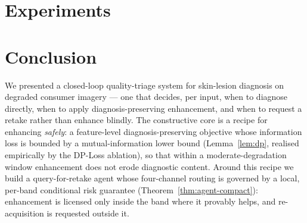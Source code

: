 \documentclass{article}
\begin{document}










\section{Experiments}\label{sec:exp}








\section{Conclusion}\label{sec:conclusion}
We presented a closed-loop quality-triage system for skin-lesion diagnosis on degraded consumer
imagery --- one that decides, per input, when to diagnose directly, when to apply
diagnosis-preserving enhancement, and when to request a retake rather than enhance blindly. The
constructive core is a recipe for enhancing \emph{safely}: a feature-level diagnosis-preserving
objective whose information loss is bounded by a mutual-information lower bound (Lemma~\ref{lem:dp},
realised empirically by the DP-Loss ablation), so that within a moderate-degradation window
enhancement does not erode diagnostic content. Around this recipe we build a query-for-retake
agent whose four-channel routing is governed by a local, per-band conditional risk guarantee
(Theorem~\ref{thm:agent-compact}): enhancement is licensed only inside the band where it provably
helps, and re-acquisition is requested outside it.
\end{document}
